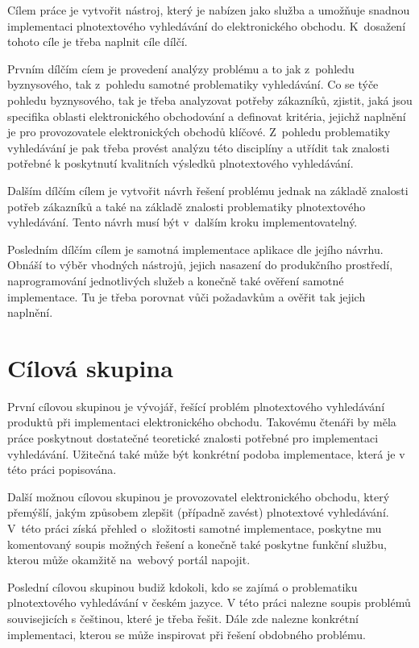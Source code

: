 \documentclass[FM,DP]{tulthesis}
\begin{document}
Cílem práce je vytvořit nástroj, který je nabízen jako služba a umožňuje snadnou implementaci
plnotextového vyhledávání do elektronického obchodu. K~dosažení tohoto cíle je třeba naplnit cíle dílčí.

Prvním dílčím cíem je provedení analýzy problému a to jak z~pohledu byznysového, tak
z~pohledu samotné problematiky vyhledávání. Co se týče pohledu byznysového, tak je třeba
analyzovat potřeby zákazníků, zjistit, jaká jsou specifika oblasti elektronického obchodování
a definovat kritéria, jejichž naplnění je pro provozovatele elektronických obchodů klíčové. 
Z~pohledu problematiky vyhledávání je pak třeba provést analýzu této disciplíny a utřídit
tak znalosti potřebné k poskytnutí kvalitních výsledků plnotextového vyhledávání.

Dalším dílčím cílem je vytvořit návrh řešení problému jednak na základě znalosti potřeb
zákazníků a také na základě znalosti problematiky plnotextového vyhledávání. Tento návrh musí 
být v~dalším kroku implementovatelný.

Posledním dílčím cílem je samotná implementace aplikace dle jejího návrhu. Obnáší to výběr 
vhodných nástrojů, jejich nasazení do produkčního prostředí, naprogramování jednotlivých
služeb a konečně také ověření samotné implementace. Tu je třeba porovnat vůči požadavkům
a ověřit tak jejich naplnění.

\section{Cílová skupina}

První cílovou skupinou je vývojář, řešící problém plnotextového vyhledávání produktů 
při implementaci elektronického obchodu. Takovému čtenáři by měla práce poskytnout dostatečné
teoretické znalosti potřebné pro implementaci vyhledávání. Užitečná také může být konkrétní
podoba implementace, která je v této práci popisována.

Další možnou cílovou skupinou je provozovatel elektronického obchodu, který přemýšlí, 
jakým způsobem zlepšit (případně zavést) plnotextové vyhledávání. V~této práci získá 
přehled o~složitosti samotné implementace, poskytne mu komentovaný soupis možných řešení 
a konečně také poskytne funkční službu, kterou může okamžitě na~webový portál napojit.

Poslední cílovou skupinou budiž kdokoli, kdo se zajímá o problematiku plnotextového 
vyhledávání v českém jazyce. V této práci nalezne soupis problémů souvisejicích s češtinou, 
které je třeba řešit. Dále zde nalezne konkrétní implementaci, kterou se může inspirovat 
při řešení obdobného problému.
\end{document}
